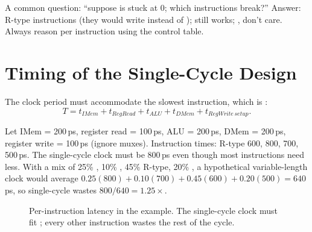 \begin{important}
A common question: ``suppose  is stuck at 0; which instructions
break?'' Answer: R-type instructions (they would write  instead of
);  still works; ,  don't care.
Always reason per instruction using the control table.
\end{important}

\section{Timing of the Single-Cycle Design}

The clock period must accommodate the slowest instruction, which is
:
\[
T = t_{IMem} + t_{RegRead} + t_{ALU} + t_{DMem} + t_{RegWrite\,setup}.
\]

\begin{example}
Let IMem = 200\,ps, register read = 100\,ps, ALU = 200\,ps, DMem = 200\,ps,
register write = 100\,ps (ignore muxes). Instruction times:
R-type 600,  800,  700,  500\,ps. The
single-cycle clock must be 800\,ps even though most instructions need less.
With a mix of 25\% , 10\% , 45\% R-type, 20\% ,
a hypothetical variable-length clock would average
$0.25(800) + 0.10(700) + 0.45(600) + 0.20(500) = 640$\,ps,
so single-cycle wastes $800/640 = 1.25\times$.
\end{example}

\begin{figure}[H]
\centering
{}
\caption{Per-instruction latency in the example. The single-cycle clock
must fit ; every other instruction wastes the rest of the cycle.}
\end{figure}


